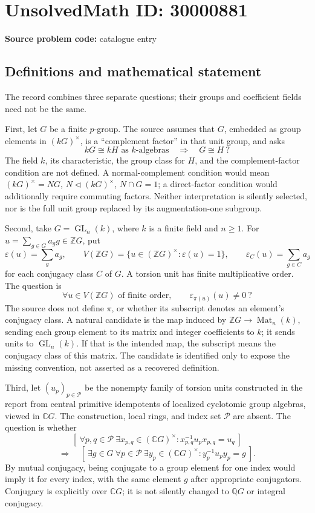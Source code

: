 \documentclass[11pt]{article}
\newcommand{\Z}{\mathbb{Z}}
\newcommand{\Q}{\mathbb{Q}}
\newcommand{\C}{\mathbb{C}}
\begin{document}
\section*{UnsolvedMath ID: 30000881}
\textbf{Source problem code:} catalogue entry
\subsection{Definitions and mathematical statement}
The record combines three separate questions; their groups and coefficient fields need not be the same.

First, let \(G\) be a finite \(p\)-group. The source assumes that \(G\), embedded as group elements in \((kG)^\times\), is a ``complement factor'' in that unit group, and asks
\[
 kG\cong kH\text{ as }k\text{-algebras}\quad\Longrightarrow\quad G\cong H\ ?
\]
The field \(k\), its characteristic, the group class for \(H\), and the complement-factor condition are not defined. A normal-complement condition would mean \((kG)^\times=NG\), \(N\triangleleft(kG)^\times\), \(N\cap G=1\); a direct-factor condition would additionally require commuting factors. Neither interpretation is silently selected, nor is the full unit group replaced by its augmentation-one subgroup.

Second, take \(G=\operatorname{GL}_n(k)\), where \(k\) is a finite field and \(n\geq1\). For \(u=\sum_{g\in G}a_g g\in\Z G\), put
\[
 \varepsilon(u)=\sum_ga_g,\qquad
 V(\Z G)=\{u\in(\Z G)^\times:\varepsilon(u)=1\},\qquad
 \varepsilon_C(u)=\sum_{g\in C}a_g
\]
for each conjugacy class \(C\) of \(G\). A torsion unit has finite multiplicative order. The question is
\[
 \forall u\in V(\Z G)\text{ of finite order},\qquad
 \varepsilon_{\pi(u)}(u)\ne0\ ?
\]
The source does not define \(\pi\), or whether its subscript denotes an element's conjugacy class. A natural candidate is the map induced by \(\Z G\to\operatorname{Mat}_n(k)\), sending each group element to its matrix and integer coefficients to \(k\); it sends units to \(\operatorname{GL}_n(k)\). If that is the intended map, the subscript means the conjugacy class of this matrix. The candidate is identified only to expose the missing convention, not asserted as a recovered definition.

Third, let \((u_p)_{p\in\mathcal P}\) be the nonempty family of torsion units constructed in the report from central primitive idempotents of localized cyclotomic group algebras, viewed in \(\C G\). The construction, local rings, and index set \(\mathcal P\) are absent. The question is whether
\[
 [\ \forall p,q\in\mathcal P\ \exists x_{p,q}\in(\C G)^\times:
 x_{p,q}^{-1}u_px_{p,q}=u_q\ ]
\]
\[
 \Longrightarrow\quad
 [\ \exists g\in G\ \forall p\in\mathcal P\ \exists y_p\in(\C G)^\times:
 y_p^{-1}u_py_p=g\ ].
\]
By mutual conjugacy, being conjugate to a group element for one index would imply it for every index, with the same element \(g\) after appropriate conjugators. Conjugacy is explicitly over \(\C G\); it is not silently changed to \(\Q G\) or integral conjugacy.
\end{document}
